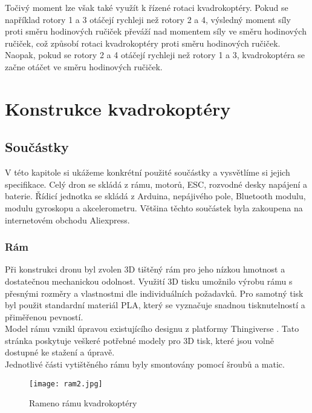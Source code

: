 \documentclass[12pt]{report}
\begin{document}
Točivý moment lze však také využít k řízené rotaci kvadrokoptéry. Pokud se například rotory 1 a 3 otáčejí rychleji než rotory 2 a 4, výsledný moment síly proti směru hodinových ručiček převáží nad momentem síly ve směru hodinových ručiček, což způsobí rotaci kvadrokoptéry proti směru hodinových ručiček. Naopak, pokud se rotory 2 a 4 otáčejí rychleji než rotory 1 a 3, kvadrokoptéra se začne otáčet ve směru hodinových ručiček. \cite{nasa}
\part{Konstrukce kvadrokoptéry} %

\chapter{Součástky}
V této kapitole si ukážeme konkrétní použité součástky a vysvětlíme si jejich specifikace. Celý dron se skládá z rámu, motorů, ESC, rozvodné desky napájení a baterie. Řídicí jednotka se skládá z Arduina, nepájivého pole, Bluetooth modulu, modulu gyroskopu a akcelerometru. Většina těchto součástek byla zakoupena na internetovém obchodu Aliexpress.

\section{Rám}
Při konstrukci dronu byl zvolen 3D tištěný rám pro jeho nízkou hmotnost a dostatečnou mechanickou odolnost. Využití 3D tisku umožnilo výrobu rámu s přesnými rozměry a vlastnostmi dle individuálních požadavků. Pro samotný tisk byl použit standardní materiál PLA, který se vyznačuje snadnou tisknutelností a přiměřenou pevností.\\
Model rámu vznikl úpravou existujícího designu z platformy Thingiverse \cite{ram}. Tato stránka poskytuje veškeré potřebné modely pro 3D tisk, které jsou volně dostupné ke stažení a úpravě.\\
Jednotlivé části vytištěného rámu byly smontovány pomocí šroubů a matic.
\begin{figure}[H]
	\centering
	\texttt{[image: ram2.jpg]}
	\caption{Rameno rámu kvadrokoptéry}
	\label{fig:ram2.jpg}
\end{figure}
\end{document}

